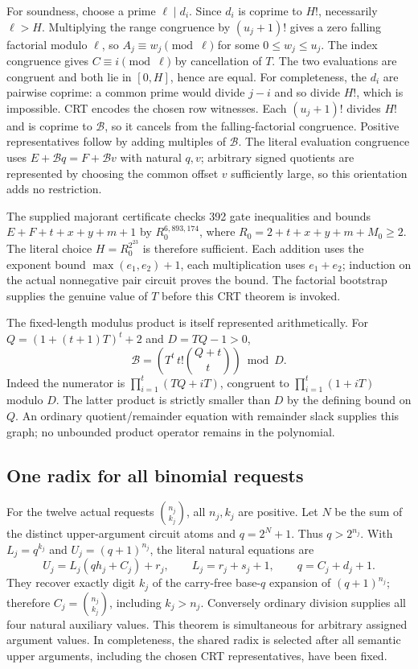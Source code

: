 For soundness, choose a prime $\ell\mid d_i$.  Since $d_i$ is coprime to
$H!$, necessarily $\ell>H$.  Multiplying the range congruence by
$(u_j+1)!$ gives a zero falling factorial modulo $\ell$, so
$A_j\equiv w_j\pmod\ell$ for some $0\le w_j\le u_j$.
The index congruence gives $C\equiv i\pmod\ell$ by cancellation of $T$.
The two evaluations are congruent and both lie in $[0,H]$, hence are equal.
For completeness, the $d_i$ are pairwise coprime: a common prime would
divide $j-i$ and so divide $H!$, which is impossible.  CRT encodes the
chosen row witnesses.  Each $(u_j+1)!$ divides $H!$ and is coprime to
$\mathcal B$, so it cancels from the falling-factorial congruence.
Positive representatives follow by adding multiples of $\mathcal B$.
The literal evaluation congruence uses
$E+\mathcal B q=F+\mathcal B v$ with natural $q,v$; arbitrary signed
quotients are represented by choosing the common offset $v$ sufficiently
large, so this orientation adds no restriction.

The supplied majorant certificate checks 392 gate inequalities and bounds
$E+F+t+x+y+m+1$ by $R_0^{6,893,174}$, where
$R_0=2+t+x+y+m+M_0\ge2$.  The literal choice
$H=R_0^{2^{23}}$ is therefore sufficient.  Each addition uses the exponent
bound $\max(e_1,e_2)+1$, each multiplication uses $e_1+e_2$; induction on
the actual nonnegative pair circuit proves the bound.  The factorial
bootstrap supplies the genuine value of $T$ before this CRT theorem is
invoked.

The fixed-length modulus product is itself represented arithmetically.
For $Q=(1+(t+1)T)^t+2$ and $D=TQ-1>0$,
\[
 \mathcal B=
 \left(T^t\,t!\binom{Q+t}{t}\right)\bmod D.
\]
Indeed the numerator is $\prod_{i=1}^t(TQ+iT)$, congruent to
$\prod_{i=1}^t(1+iT)$ modulo $D$.  The latter product is strictly smaller
than $D$ by the defining bound on $Q$.  An ordinary quotient/remainder
equation with remainder slack supplies this graph; no unbounded product
operator remains in the polynomial.

\subsection{One radix for all binomial requests}

For the twelve actual requests $\binom{n_j}{k_j}$, all $n_j,k_j$ are
positive.  Let $N$ be the sum of the distinct upper-argument circuit atoms
and $q=2^N+1$.  Thus $q>2^{n_j}$.  With
$L_j=q^{k_j}$ and $U_j=(q+1)^{n_j}$, the literal natural equations are
\[
 U_j=L_j(qh_j+C_j)+r_j,\qquad
 L_j=r_j+s_j+1,\qquad q=C_j+d_j+1.
\]
They recover exactly digit $k_j$ of the carry-free base-$q$ expansion of
$(q+1)^{n_j}$; therefore $C_j=\binom{n_j}{k_j}$, including $k_j>n_j$.
Conversely ordinary division supplies all four natural auxiliary values.
This theorem is simultaneous for arbitrary assigned argument values.
In completeness, the shared radix is selected after all semantic upper
arguments, including the chosen CRT representatives, have been fixed.

